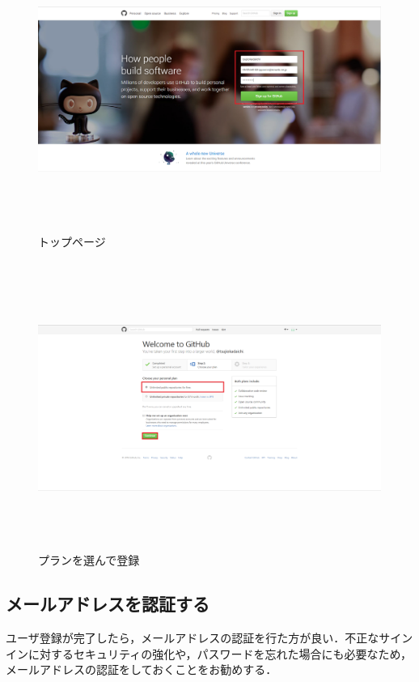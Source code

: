  \begin{figure}[htb]
\centering　
\includegraphics[height=8.5cm,width=13cm]{top.PNG}
\caption{トップページ}
\end{figure}

\newpage



\begin{figure}[htb]
\centering　
\includegraphics[height=8.5cm,width=13cm]{plan.PNG}
\caption{プランを選んで登録}
\end{figure}

\subsection{メールアドレスを認証する}
ユーザ登録が完了したら，メールアドレスの認証を行た方が良い．不正なサインインに対するセキュリティの強化や，パスワードを忘れた場合にも必要なため，メールアドレスの認証をしておくことをお勧めする．

